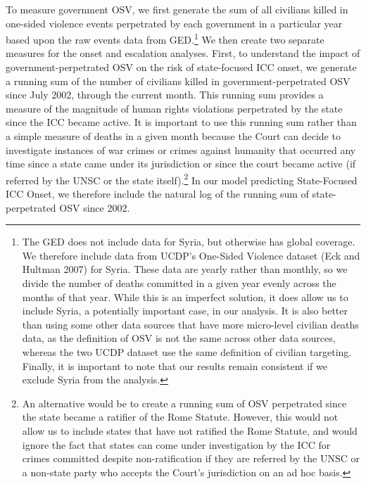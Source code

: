 To measure government OSV, we first generate the sum of all civilians killed in one-sided violence events perpetrated by each government in a particular year based upon the raw events data from GED.\footnote{The GED does not include data for Syria, but otherwise has global coverage. We therefore include data from UCDP's One-Sided Violence dataset (Eck and Hultman 2007) for Syria. These data are yearly rather than monthly, so we divide the number of deaths committed in a given year evenly across the months of that year. While this is an imperfect solution, it does allow us to include Syria, a potentially important case, in our analysis. It is also better than using some other data sources that have more micro-level civilian deaths data, as the definition of OSV is not the same across other data sources, whereas the two UCDP dataset use the same definition of civilian targeting. Finally, it is important to note that our results remain consistent if we exclude Syria from the analysis.} We then create two separate measures for the onset and escalation analyses. First, to understand the impact of government-perpetrated OSV on the risk of state-focused ICC onset, we generate a running sum of the number of civilians killed in government-perpetrated OSV since July 2002, through the current month. This running sum provides a measure of the magnitude of human rights violations perpetrated by the state since the ICC became active. It is important to use this running sum rather than a simple measure of deaths in a given month because the Court can decide to investigate instances of war crimes or crimes against humanity that occurred any time since a state came under its jurisdiction or since the court became active (if referred by the UNSC or the state itself).\footnote{An alternative would be to create a running sum of OSV perpetrated since the state became a ratifier of the Rome Statute. However, this would not allow us to include states that have not ratified the Rome Statute, and would ignore the fact that states can come under investigation by the ICC for crimes committed despite non-ratification if they are referred by the UNSC or a non-state party who accepts the Court's jurisdiction on an ad hoc basis.} In our model predicting State-Focused ICC Onset, we therefore include the natural log of the running sum of state-perpetrated OSV since 2002. 

